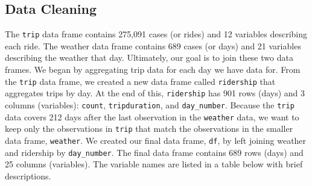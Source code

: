 \documentclass[
]{article}
\begin{document}
\subsection{Data Cleaning}\label{data-cleaning}

The \texttt{trip} data frame contains 275,091 cases (or rides) and 12
variables describing each ride. The weather data frame contains 689
cases (or days) and 21 variables describing the weather that day.
Ultimately, our goal is to join these two data frames. We began by
aggregating trip data for each day we have data for. From the
\texttt{trip} data frame, we created a new data frame called
\texttt{ridership} that aggregates trips by day. At the end of this,
\texttt{ridership} has 901 rows (days) and 3 columns (variables):
\texttt{count}, \texttt{tripduration}, and \texttt{day\_number}. Because
the \texttt{trip} data covers 212 days after the last observation in the
\texttt{weather} data, we want to keep only the observations in
\texttt{trip} that match the observations in the smaller data frame,
\texttt{weather}. We created our final data frame, \texttt{df}, by left
joining weather and ridership by \texttt{day\_number}. The final data
frame contains 689 rows (days) and 25 columns (variables). The variable
names are listed in a table below with brief descriptions.
\end{document}
